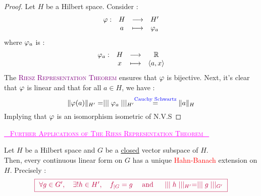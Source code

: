 \begin{proof}
Let $H $ be a Hilbert space. Consider : 
\[
\begin{array}{cccc}
      \varphi   : &  H  & \longrightarrow & H' \\

           &  a  & \longmapsto     & \varphi _{a} \\ 
\end{array}
\]
where $\varphi _{a}$ is :
\[
\begin{array}{cccc}
      \varphi _{a} : &  H  & \longrightarrow & \mathbb{R}  \\

           &  x  & \longmapsto     & \left\langle a,x \right\rangle  \\ 
\end{array}
\]
The \textcolor{purple}{
  \textsc{
Riesz Representation Theorem}
  } ensures that $\varphi  $ is bijective. Next, 
  it's clear that $\varphi  $ is linear and that for all $a \in  H$, we have :  
  \[
  \| \varphi (a)  \| _{H'} = 
  \mid \mid \mid  \varphi _{a} \mid \mid \mid _{H'} \overset{
    \text{\textcolor{blue}{Cauchy Schwartz}} 
  }{=}  
  \| a \| _{H}
  \]
  Implying that $\varphi  $ is an isomorphism isometric of N.V.S
\end{proof}
\begin{center}
  \textsc{
    \textcolor{magenta}{
      \underline{
      \righthand ~ Further Applications of The Riess Representation Theorem ~
      \lefthand
      }
    }
  }
\end{center}
\begin{corollary}[]
  Let $H $ be a Hilbert space and $G $ be a \underline{closed}
  vector subspace of $H$.  \\
  Then, every continuous linear form on $G$ has a unique 
  \textcolor{red}{Hahn-Banach} extension on $H$. Precisely : 
  \[
    \textcolor{purple}{
    \fbox{
      $\forall g \in  G', 
      \quad \exists ! h \in  H', \quad 
      f_{|G} = g \quad \text{ and } \quad 
      \mid \mid \mid  h \mid \mid \mid _{H'} = 
      \mid \mid \mid  g \mid \mid \mid _{G'}$ 
    }
    }
  \]
\end{corollary}
